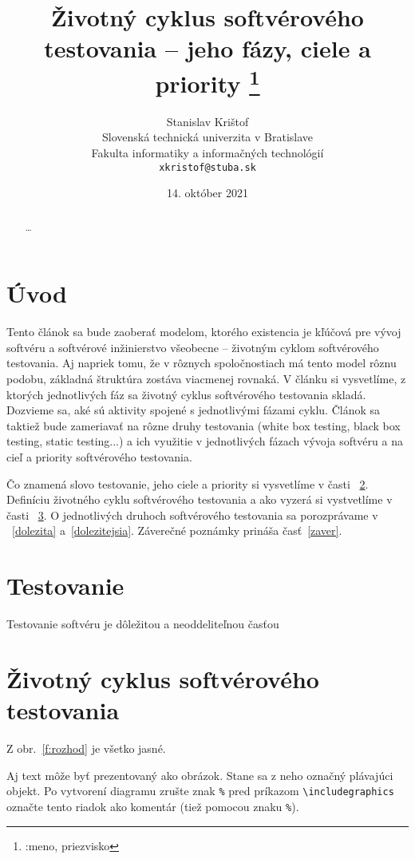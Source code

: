 \documentclass[10pt,twoside,slovak,a4paper]{article}
\title{Životný cyklus softvérového testovania – jeho fázy, ciele a priority
\thanks{:meno, priezvisko}} %
\author{Stanislav Krištof\\[2pt]
	{\small Slovenská technická univerzita v Bratislave}\\
	{\small Fakulta informatiky a informačných technológií}\\
	{\small \texttt{xkristof@stuba.sk}}
	}
\date{\small 14. október 2021} %
\begin{document}
\maketitle
\begin{abstract}
\ldots
\end{abstract}



\section{Úvod}
Tento článok sa bude zaoberať modelom, ktorého existencia je kľúčová pre vývoj softvéru a 
softvérové inžinierstvo všeobecne – životným cyklom softvérového testovania. Aj napriek tomu, že 
v rôznych spoločnostiach má tento model rôznu podobu, základná štruktúra zostáva viacmenej 
rovnaká. V článku si vysvetlíme, z ktorých jednotlivých fáz sa životný cyklus softvérového 
testovania skladá. Dozvieme sa, aké sú aktivity spojené s jednotlivými fázami cyklu. Článok sa 
taktiež bude zameriavať na rôzne druhy testovania (white box testing, black box testing, static 
testing...) a ich využitie v jednotlivých fázach vývoja softvéru a na cieľ a priority softvérového 
testovania.

Čo znamená slovo testovanie, jeho ciele a priority si vysvetlíme v časti ~\ref{testovanie}.
Definíciu životného cyklu softvérového testovania a ako vyzerá si vystvetlíme v časti ~\ref{diagram}.
O jednotlivých druhoch softvérového testovania sa porozprávame v ~\ref{dolezita} a~\ref{dolezitejsia}.
Záverečné poznámky prináša časť~\ref{zaver}.



\section{Testovanie} \label{testovanie}

\begin{figure*}[tbh]
\centering
Testovanie softvéru je dôležitou a neoddeliteľnou časťou
\end{figure*}


\section{Životný cyklus softvérového testovania} \label{diagram}

Z obr.~\ref{f:rozhod} je všetko jasné. 

\begin{figure*}[tbh]
\centering
Aj text môže byť prezentovaný ako obrázok. Stane sa z neho označný plávajúci objekt. Po vytvorení diagramu zrušte znak \texttt{\%} pred príkazom \verb|\includegraphics| označte tento riadok ako komentár (tiež pomocou znaku \texttt{\%}).
\caption{Rozhodujúci argument.}
\label{f:rozhod}
\end{figure*}
\end{document}
